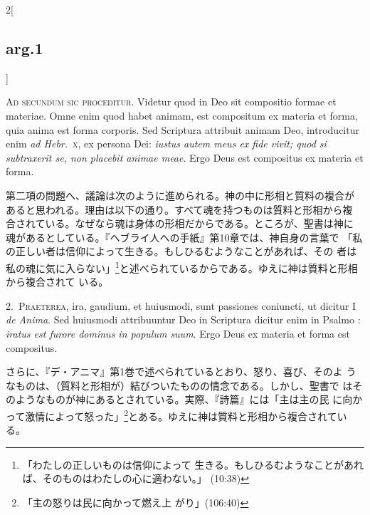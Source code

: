 \documentclass[paper=a4paper,fontsize=10pt,jafontsize=9pt,titlepage]{jlreq}
\begin{document}
\begin{paracol}{2}[\subsection{arg.1}]

{\huge A}{\scshape d secundum sic proceditur}. Videtur quod in Deo sit
compositio formae et materiae. Omne enim quod habet animam, est
compositum ex materia et forma, quia anima est forma corporis. Sed
Scriptura attribuit animam Deo, introducitur enim \textit{ad
Hebr.}~\textsc{x}, ex persona Dei: \textit{iustus autem meus ex fide
vivit; quod si subtraxerit se, non placebit animae meae}. Ergo Deus
est compositus ex materia et forma.

\switchcolumn

第二項の問題へ、議論は次のように進められる。神の中に形相と質料の複合が
あると思われる。理由は以下の通り。すべて魂を持つものは質料と形相から複
合されている。なぜなら魂は身体の形相だからである。ところが、聖書は神に
魂があるとしている。『ヘブライ人への手紙』第10章では、神自身の言葉で
「私の正しい者は信仰によって生きる。もしひるむようなことがあれば、その
者は私の魂に気に入らない」\footnote{「わたしの正しいものは信仰によって
生きる。もしひるむようなことがあれば、そのものはわたしの心に適わない。」
(10:38)}と述べられているからである。ゆえに神は質料と形相から複合されて
いる。


2.~\textsc{Praeterea}, ira, gaudium, et huiusmodi, sunt passiones
coniuncti, ut dicitur I \textit{de Anima}. Sed huiusmodi attribuuntur
Deo in Scriptura dicitur enim in Psalmo : \textit{iratus est furore
dominus in populum suum}. Ergo Deus ex materia et forma est
compositus.

\switchcolumn

さらに、『デ・アニマ』第1巻で述べられているとおり、怒り、喜び、そのよ
うなものは、（質料と形相が）結びついたものの情念である。しかし、聖書で
はそのようなものが神にあるとされている。実際、『詩篇』には「主は主の民
に向かって激情によって怒った」\footnote{「主の怒りは民に向かって燃え上
がり」(106:40)}とある。ゆえに神は質料と形相から複合されている。



\end{paracol}
\end{document}
